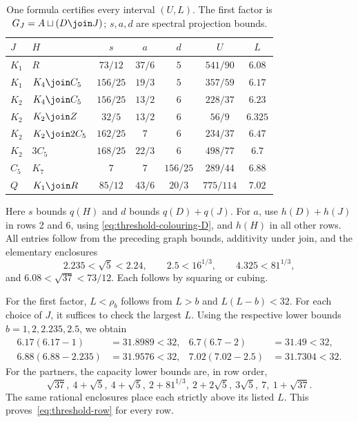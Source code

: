 \begin{table}[htbp]
\centering
\small
\renewcommand{\arraystretch}{1.18}
\begin{tabular}{@{}llccccc@{}}
\toprule
$J$ & $H$ & $s$ & $a$ & $d$ & $U$ & $L$\\
\midrule
$K_1$ & $R$ & $73/12$ & $37/6$ & $5$ & $541/90$ & $6.08$\\
$K_1$ & $K_4\join C_5$ & $156/25$ & $19/3$ & $5$ & $357/59$ & $6.17$\\
$K_2$ & $K_4\join C_5$ & $156/25$ & $13/2$ & $6$ & $228/37$ & $6.23$\\
$K_2$ & $K_2\join Z$ & $32/5$ & $13/2$ & $6$ & $56/9$ & $6.325$\\
$K_2$ & $K_2\join2C_5$ & $162/25$ & $7$ & $6$ & $234/37$ & $6.47$\\
$K_2$ & $3C_5$ & $168/25$ & $22/3$ & $6$ & $498/77$ & $6.7$\\
$C_5$ & $K_7$ & $7$ & $7$ & $156/25$ & $289/44$ & $6.88$\\
$Q$ & $K_1\join R$ & $85/12$ & $43/6$ & $20/3$ & $775/114$ & $7.02$\\
\bottomrule
\end{tabular}
\caption{One formula certifies every interval $(U,L)$. The first factor
is $G_J=A\sqcup(D\join J)$; $s,a,d$ are spectral projection bounds.}
\label{tab:threshold-cover}
\end{table}

Here $s$ bounds $q(H)$ and $d$ bounds $q(D)+q(J)$.
For $a$, use $h(D)+h(J)$ in rows 2 and 6, using
\eqref{eq:threshold-colouring-D}, and $h(H)$ in all other rows.
All entries follow from the preceding graph bounds, additivity under
join, and the elementary enclosures
\[
 2.235<\sqrt5<2.24,\qquad
 2.5<16^{1/3},\qquad 4.325<81^{1/3},
\]
and $6.08<\sqrt{37}<73/12$. Each follows by squaring or cubing.

For the first factor, $L<\rho_b$ follows from $L>b$ and
$L(L-b)<32$. For each choice of $J$, it suffices to check the largest
$L$. Using the respective lower bounds $b=1,2,2.235,2.5$, we obtain
\[
\begin{aligned}
 6.17(6.17-1)&=31.8989<32,&
 6.7(6.7-2)&=31.49<32,\\
 6.88(6.88-2.235)&=31.9576<32,&
 7.02(7.02-2.5)&=31.7304<32.
\end{aligned}
\]
For the partners, the capacity lower bounds are, in row order,
\[
 \sqrt{37},\ 4+\sqrt5,\ 4+\sqrt5,\ 2+81^{1/3},\
 2+2\sqrt5,\ 3\sqrt5,\ 7,\ 1+\sqrt{37}.
\]
The same rational enclosures place each strictly above its listed $L$.
This proves~\eqref{eq:threshold-row} for every row.

